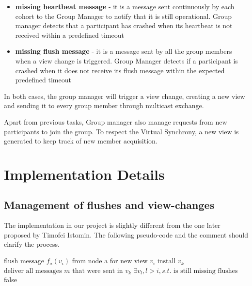 \documentclass[11pt]{article}
\begin{document}
	\begin{itemize}
		\item \textbf{missing heartbeat message} - it is a message sent continuously by each cohort to the Group Manager to notify that it is still operational. Group manager detects that a participant has crashed when its heartbeat is not received within a predefined timeout
		\item \textbf{missing flush message} - it is a message sent by all the group members when a view change is triggered. Group Manager detects if a participant is crashed when it does not receive its flush message within the expected predefined timeout
	\end{itemize}
	In both cases, the group manager will trigger a view change, creating a new view and sending it to every group member through multicast exchange.
	
	Apart from previous tasks, Group manager also manage requests from new participants to join the group. To respect the Virtual Synchrony, a new view is generated to keep track of new member acquisition.
	
	
	\section{Implementation Details}
	\label{sec:imp_details}
	\subsection{Management of flushes and view-changes}
	The implementation in our project is slightly different from the one later proposed by Timofei Istomin. The following pseudo-code and the comment should clarify the process.
	
	\begin{algorithm}
	\begin{algorithmic}
		\REQUIRE $\text{flush message }f_{a}(v_{i}) \text{ from node a for new view } v_{i} $
				\STATE $ \text{install } v_{k} $
				\STATE $ \text{deliver all messages } m \text{ that were sent in } v_{k} $
			\ENDFOR
			\RETURN $ \exists v_{l}, l > i, s.t. \text{ is still missing flushes}$
		\ENDIF
		\RETURN false
	\end{algorithmic}	
	\end{algorithm}	
	
\end{document}
